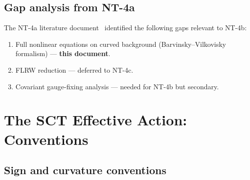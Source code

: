 \documentclass[12pt,a4paper]{article}
\theoremstyle{definition}
\theoremstyle{remark}
\begin{document}
\subsection{Gap analysis from NT-4a}

The NT-4a literature document~\cite{NT4aLit} identified the following
gaps relevant to NT-4b:
\begin{enumerate}[label=\textbf{G\arabic*.}]
  \item Full nonlinear equations on curved background
    (Barvinsky--Vilkovisky formalism) --- \textbf{this document}.
  \item FLRW reduction --- deferred to NT-4c.
  \item Covariant gauge-fixing analysis --- needed for NT-4b but
    secondary.
\end{enumerate}


\section{The SCT Effective Action: Conventions}
\label{sec:action}

\subsection{Sign and curvature conventions}
\end{document}
